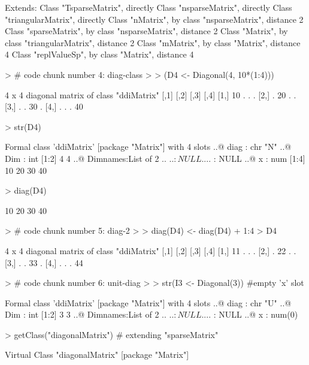 \documentclass{article}
\begin{document}
\begin{Schunk}
\begin{Soutput}
Extends: 
Class "TsparseMatrix", directly
Class "nsparseMatrix", directly
Class "triangularMatrix", directly
Class "nMatrix", by class "nsparseMatrix", distance 2
Class "sparseMatrix", by class "nsparseMatrix", distance 2
Class "Matrix", by class "triangularMatrix", distance 2
Class "mMatrix", by class "Matrix", distance 4
Class "replValueSp", by class "Matrix", distance 4
\end{Soutput}
\begin{Sinput}
> # code chunk number 4: diag-class
> 
> (D4 <- Diagonal(4, 10*(1:4)))
\end{Sinput}
\begin{Soutput}
4 x 4 diagonal matrix of class "ddiMatrix"
     [,1] [,2] [,3] [,4]
[1,]   10    .    .    .
[2,]    .   20    .    .
[3,]    .    .   30    .
[4,]    .    .    .   40
\end{Soutput}
\begin{Sinput}
> str(D4)
\end{Sinput}
\begin{Soutput}
Formal class 'ddiMatrix' [package "Matrix"] with 4 slots
  ..@ diag    : chr "N"
  ..@ Dim     : int [1:2] 4 4
  ..@ Dimnames:List of 2
  .. ..$ : NULL
  .. ..$ : NULL
  ..@ x       : num [1:4] 10 20 30 40
\end{Soutput}
\begin{Sinput}
> diag(D4)
\end{Sinput}
\begin{Soutput}
[1] 10 20 30 40
\end{Soutput}
\begin{Sinput}
> # code chunk number 5: diag-2
> 
> diag(D4) <- diag(D4) + 1:4
> D4
\end{Sinput}
\begin{Soutput}
4 x 4 diagonal matrix of class "ddiMatrix"
     [,1] [,2] [,3] [,4]
[1,]   11    .    .    .
[2,]    .   22    .    .
[3,]    .    .   33    .
[4,]    .    .    .   44
\end{Soutput}
\begin{Sinput}
> # code chunk number 6: unit-diag
> 
> str(I3 <- Diagonal(3))  #empty 'x' slot
\end{Sinput}
\begin{Soutput}
Formal class 'ddiMatrix' [package "Matrix"] with 4 slots
  ..@ diag    : chr "U"
  ..@ Dim     : int [1:2] 3 3
  ..@ Dimnames:List of 2
  .. ..$ : NULL
  .. ..$ : NULL
  ..@ x       : num(0) 
\end{Soutput}
\begin{Sinput}
> getClass("diagonalMatrix")  # extending "sparseMatrix"
\end{Sinput}
\begin{Soutput}
Virtual Class "diagonalMatrix" [package "Matrix"]


\end{Soutput}
\end{Schunk}
\end{document}
